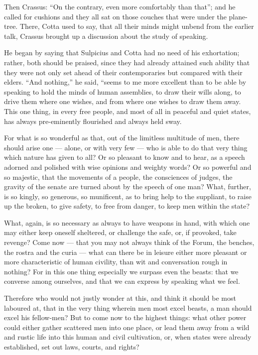  Then Crassus: ``On the contrary, even more comfortably than that''; and he called for cushions and they all sat on those couches that were under the plane-tree. There, Cotta used to say, that all their minds might unbend from the earlier talk, Crassus brought up a discussion about the study of speaking.

 He began by saying that Sulpicius and Cotta had no need of his exhortation; rather, both should be praised, since they had already attained such ability that they were not only set ahead of their contemporaries but compared with their elders. ``And nothing,'' he said, ``seems to me more excellent than to be able by speaking to hold the minds of human assemblies, to draw their wills along, to drive them where one wishes, and from where one wishes to draw them away. This one thing, in every free people, and most of all in peaceful and quiet states, has always pre-eminently flourished and always held sway.

 For what is so wonderful as that, out of the limitless multitude of men, there should arise one — alone, or with very few — who is able to do that very thing which nature has given to all? Or so pleasant to know and to hear, as a speech adorned and polished with wise opinions and weighty words? Or so powerful and so majestic, that the movements of a people, the consciences of judges, the gravity of the senate are turned about by the speech of one man? What, further, is so kingly, so generous, so munificent, as to bring help to the suppliant, to raise up the broken, to give safety, to free from danger, to keep men within the state?

 What, again, is so necessary as always to have weapons in hand, with which one may either keep oneself sheltered, or challenge the safe, or, if provoked, take revenge? Come now — that you may not always think of the Forum, the benches, the rostra and the curia — what can there be in leisure either more pleasant or more characteristic of human civility, than wit and conversation rough in nothing? For in this one thing especially we surpass even the beasts: that we converse among ourselves, and that we can express by speaking what we feel.

 Therefore who would not justly wonder at this, and think it should be most laboured at, that in the very thing wherein men most excel beasts, a man should excel his fellow-men? But to come now to the highest things: what other power could either gather scattered men into one place, or lead them away from a wild and rustic life into this human and civil cultivation, or, when states were already established, set out laws, courts, and rights?

